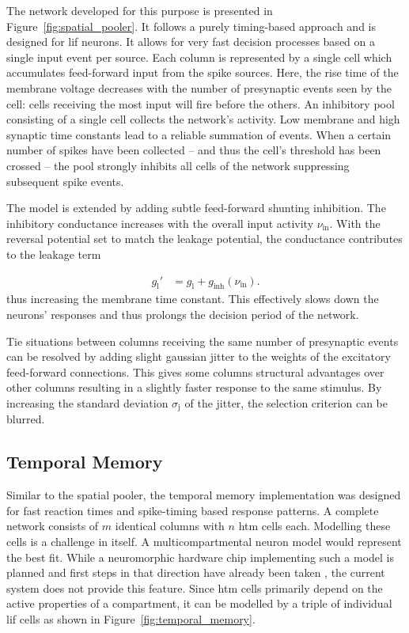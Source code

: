The network developed for this purpose is presented in
Figure~\ref{fig:spatial_pooler}. It follows a purely timing-based approach and
is designed for \gls{lif} neurons. It allows for very fast decision processes
based on a single input event per source. Each column is represented by a single
cell which accumulates feed-forward input from the spike sources. Here, the rise
time of the membrane voltage decreases with the number of presynaptic events
seen by the cell: cells receiving the most input will fire before the others. An
inhibitory pool consisting of a single cell collects the network's activity. Low
membrane and high synaptic time constants lead to a reliable summation of
events. When a certain number of spikes have been collected -- and thus the
cell's threshold has been crossed -- the pool strongly inhibits all cells of
the network suppressing subsequent spike events.

The model is extended by adding subtle feed-forward shunting inhibition. The
inhibitory conductance increases with the overall input activity
$\nu_\text{in}$. With the reversal potential set to match the leakage potential,
the conductance contributes to the leakage term

\begin{align*}
	g_\text{l}' &= g_\text{l} + g_\text{inh}(\nu_\text{in}).
\end{align*}
%
thus increasing the membrane time constant. This effectively slows down the
neurons' responses and thus prolongs the decision period of the network.

Tie situations between columns receiving the same number of presynaptic events can be resolved by adding slight gaussian jitter to the weights of the excitatory feed-forward connections. This gives some columns structural advantages over other columns resulting in a slightly faster response to the same stimulus. By increasing the standard deviation $\sigma_\text{j}$ of the jitter, the selection criterion can be blurred.


\subsection{Temporal Memory}

Similar to the spatial pooler, the temporal memory implementation was  designed
for fast reaction times and spike-timing based response patterns. A complete
network consists of $m$ identical columns with $n$ \gls{htm} cells each.
Modelling these cells is a challenge in itself. A multicompartmental neuron
model would represent the best fit. While a neuromorphic hardware chip
implementing such a model is planned and first steps in that direction have
already been taken \citep{millner2012development}, the current system does not
provide this feature. Since \gls{htm} cells primarily depend on the active
properties of a compartment, it can be modelled by a triple of individual
\gls{lif} cells as shown in Figure~\ref{fig:temporal_memory}.

